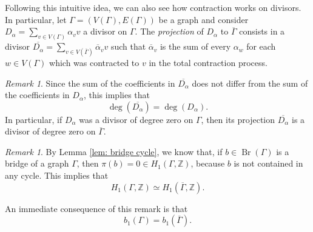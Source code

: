 \documentclass[a4paper,12 pt,titlepage,twoside]{book}
\newcommand{\numberset}{\mathbb}
\newcommand{\Z}{\numberset{Z}}
\DeclareMathOperator{\br}{Br}
\theoremstyle{plain}
\theoremstyle{theorem}
\theoremstyle{definition}
\theoremstyle{remark}
\newtheorem{oss}[thm]{Remark}
\begin{document}
	Following this intuitive idea, we can also see how contraction works on divisors. In particular, let $\Gamma=(V(\Gamma),E(\Gamma))$ be a graph and consider $D_\alpha= \sum_{v \in V(\Gamma)} \alpha_v v$ a divisor on $\Gamma.$ The \emph{projection} of $D_\alpha$ to $\overline{\Gamma}$ consists in a divisor $\overline{D_\alpha} = \sum_{v \in V(\overline{\Gamma})} \overline{\alpha}_v v$ such that $\overline{\alpha}_v$ is the sum of every $\alpha_w$ for each $w \in V(\Gamma)$ which was contracted to $v$  in the total contraction process.
	\begin{oss}
		Since the sum of the coefficients in $\overline{D_\alpha}$ does not differ from the sum of the coefficients in $D_\alpha$, this implies that $$\deg(\overline{D_\alpha}) = \deg(D_\alpha).$$ In particular, if $D_\alpha$ was a divisor of degree zero on $\Gamma$, then its projection $\overline{D_\alpha}$ is a divisor of degree zero on $\overline{\Gamma}.$
	\end{oss}
	\begin{oss}\label{oss: H1 bridge}
		By Lemma \ref{lem: bridge cycle}, we know that, if $b \in \br(\Gamma)$ is a bridge of a graph $\Gamma$, then $\pi(b)=0 \in H_1(\Gamma, \Z)$, because $b$ is not contained in any cycle. This implies that $$H_1(\Gamma, \Z) \simeq H_1(\overline{\Gamma},\Z).$$
	\end{oss}
	An immediate consequence of this remark is that $$b_1(\Gamma) = b_1(\overline{\Gamma}).$$
	
\end{document}

